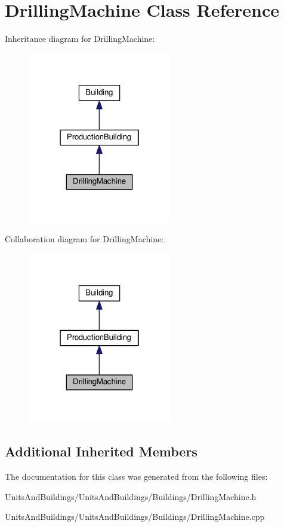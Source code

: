 \hypertarget{class_drilling_machine}{}\section{Drilling\+Machine Class Reference}
\label{class_drilling_machine}


Inheritance diagram for Drilling\+Machine\+:
\nopagebreak
\begin{figure}[H]
\begin{center}
\leavevmode
\includegraphics[width=178pt]{class_drilling_machine__inherit__graph}
\end{center}
\end{figure}


Collaboration diagram for Drilling\+Machine\+:
\nopagebreak
\begin{figure}[H]
\begin{center}
\leavevmode
\includegraphics[width=178pt]{class_drilling_machine__coll__graph}
\end{center}
\end{figure}
\subsection*{Additional Inherited Members}


The documentation for this class was generated from the following files\+:\begin{DoxyCompactItemize}
\item 
Units\+And\+Buildings/\+Units\+And\+Buildings/\+Buildings/Drilling\+Machine.\+h\item 
Units\+And\+Buildings/\+Units\+And\+Buildings/\+Buildings/Drilling\+Machine.\+cpp\end{DoxyCompactItemize}
